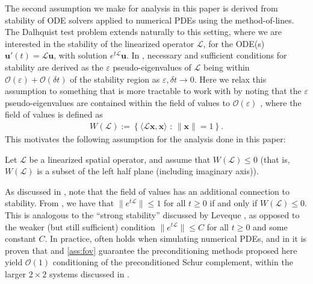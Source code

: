 \documentclass[review]{siamart}
\begin{document}
The second assumption we make for analysis in this paper is derived from
stability of ODE solvers applied to numerical PDEs using the method-of-lines.
The Dalhquist test problem extends naturally to this setting, where we are
interested in the stability of the linearized operator $\mathcal{L}$, for
the ODE(s) $\mathbf{u}'(t) = \mathcal{L}\mathbf{u}$, with solution
$e^{t\mathcal{L}}\mathbf{u}$. In \cite{reddy92}, necessary and sufficient
conditions for stability are derived as the $\varepsilon$ pseudo-eigenvalues
of $\mathcal{L}$ being within $\mathcal{O}(\varepsilon) + \mathcal{O}(\delta t)$
of the stability region as $\varepsilon,\delta t\to 0$. Here we relax this
assumption to something that is more tractable to work with by noting that
the $\varepsilon$ pseudo-eigenvalues are contained within the field of values
to $\mathcal{O}(\varepsilon)$ \cite[Eq. (17.9)]{trefethen2005spectra},
where the field of values is defined as
%
\begin{align}\label{eq:fov}
W(\mathcal{L}) := \left\{ \langle \mathcal{L}\mathbf{x},\mathbf{x}\rangle \text{ : }
	\|\mathbf{x}\| = 1 \right\}.
\end{align}
%
This motivates the following assumption for the analysis done in this paper:
%
\begin{assumption}\label{ass:fov}
Let $\mathcal{L}$ be a linearized spatial operator, and assume that $W(\mathcal{L}) \leq 0$
(that is, $W(\mathcal{L})$ is a subset of the left half plane (including imaginary axis)).
\end{assumption}
%
As discussed in \cite{irk1}, note that the field of values has an additional
connection to stability. From \cite[Theorem 17.1]{trefethen2005spectra}, we
have that $\|e^{t\mathcal{L}}\|\leq 1$ for all $t\geq 0$ if and only if
$W(\mathcal{L}) \leq 0$. This is analogous to the ``strong stability'' discussed
by Leveque \cite[Chapter 9.5]{leveque2007finite}, as opposed to the weaker (but
still sufficient) condition $\|e^{t\mathcal{L}}\|\leq C$ for all $t\geq 0$ and
some constant $C$. In practice,  often holds when
simulating numerical PDEs, and in  it is proven that
 and \ref{ass:fov} guarantee the preconditioning methods
proposed here yield $\mathcal{O}(1)$ conditioning of the preconditioned Schur
complement, within the larger $2\times 2$ systems discussed in
.


\end{document}

